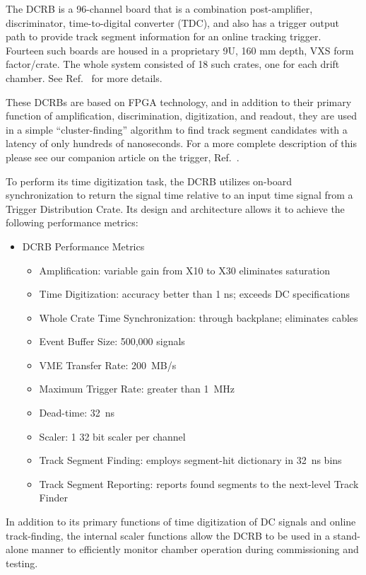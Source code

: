 The DCRB is a 96-channel board that is a combination post-amplifier,
discriminator, time-to-digital converter (TDC), and also has a trigger
output path to provide track segment information for an online tracking trigger.
Fourteen such boards are housed in
a proprietary 9U, 160 mm depth, VXS form factor/crate.
The whole system consisted of 18 such crates, one for each drift chamber.
See Ref.~\cite{daq-nim} for more details.

These DCRBs are based on FPGA technology, and in addition to
their primary function of amplification, discrimination, digitization,
and readout, they are used in a simple ``cluster-finding'' algorithm
to find track segment candidates with a latency of only hundreds
of nanoseconds.  For a more complete description of this please
see our companion article on the trigger, Ref.~\cite{trigger-nim}.

To perform its time digitization task, the DCRB utilizes on-board synchronization to
return the signal time relative to an input time signal from  a Trigger Distribution
Crate. Its design and architecture
allows it to achieve the following performance metrics:
\begin{itemize}
\item DCRB Performance Metrics
\begin{itemize}
\item Amplification: variable gain from X10 to X30 eliminates saturation
\item Time Digitization: accuracy better than 1 ns; exceeds DC specifications
\item Whole Crate Time Synchronization: through backplane; eliminates cables
\item Event Buffer Size: 500,000 signals
\item VME Transfer Rate: 200~MB/s
\item Maximum Trigger Rate: greater than 1~MHz
\item Dead-time: 32~ns
\item Scaler: 1 32 bit scaler per channel
\item Track Segment Finding: employs segment-hit dictionary in 32~ns bins
\item Track Segment Reporting: reports found segments to the next-level Track Finder
\end{itemize}
\end{itemize}

In addition to its primary functions of time digitization of DC signals and online
track-finding, the internal scaler functions allow the DCRB to be used in 
a stand-alone manner to efficiently monitor chamber operation during commissioning
and testing.

